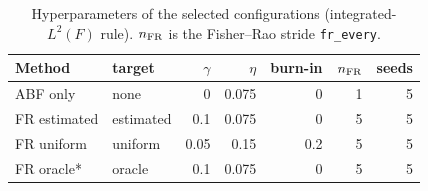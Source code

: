 \begin{table}[t]
\centering
\small
\caption{Hyperparameters of the selected configurations (integrated-$L^2(F)$ rule). $n_{\rm FR}$ is the Fisher--Rao stride \texttt{fr\_every}.}
\label{tab:selected_configs}
\begin{tabular}{llrrrrr}
\toprule
Method & target & $\gamma$ & $\eta$ & burn-in & $n_{\rm FR}$ & seeds \\
\midrule
ABF only & none & 0 & 0.075 & 0 & 1 & 5 \\
FR estimated & estimated & 0.1 & 0.075 & 0 & 5 & 5 \\
FR uniform & uniform & 0.05 & 0.15 & 0.2 & 5 & 5 \\
FR oracle* & oracle & 0.1 & 0.075 & 0 & 5 & 5 \\
\bottomrule
\end{tabular}
\end{table}
